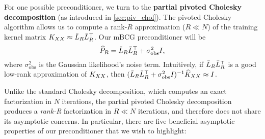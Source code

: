 For one possible preconditioner, we turn to the {\bf partial pivoted Cholesky decomposition} (as introduced in \cref{sec:piv_chol}).
The pivoted Cholesky algorithm allows us to compute a rank-$R$ approximation ($R \ll N$) of the training kernel matrix $K_{XX} \approx \bar{L}_{R} \bar{L}_{R}^{\top}$.
Our mBCG preconditioner will be
\begin{equation}
  \widehat{P}_R = \bar{L}_{R} \bar{L}_{R}^\top + \sigma^2_\text{obs} I,
\end{equation}
where $\sigma_\text{obs}^2$ is the Gaussian likelihood's noise term.
Intuitively, if $\bar{L}_{R}\bar{L}_{R}^{\top}$ is a good low-rank approximation of $K_{XX}$, then $(\bar{L}_{R} \bar{L}_R^\top + \sigma_\text{obs}^{2}I)^{-1}\widehat{K}_{XX} \approx I$.


Unlike the standard Cholesky decomposition, which computes an exact factorization in $N$ iterations,
the partial pivoted Cholesky decomposition produces a \emph{rank-R} factorization in $R \ll N$ iterations, and therefore does not share its asymptotic concerns.
In particular, there are five beneficial asymptotic properties of our preconditioner that we wish to highlight:
%

